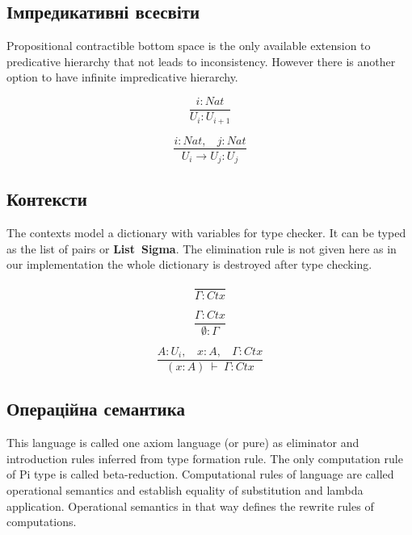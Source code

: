 \begin{definition}
\begin{definition}
\begin{definition}
\begin{definition}
\subsection*{Імпредикативні всесвіти}
Propositional contractible bottom space is the only
available extension to predicative hierarchy that not leads to inconsistency.
However there is another option to have infinite
impredicative hierarchy.

\begin{equation}
\tag{$A_2$}
\dfrac
{i: Nat}
{U_i : U_{i+1}}
\end{equation}

\begin{equation}
\tag{$R_2$}
\dfrac
{i : Nat,\ \ \ \ j : Nat}
{U_i \rightarrow U_{j} : U_{j}}
\end{equation}

\subsection{Контексти}

The contexts model a dictionary with variables for type checker.
It can be typed as the list of pairs or {\bf List\ Sigma}.
The elimination rule is not given here as in our implementation the whole dictionary is destroyed after type checking.

\begin{equation}
\tag{Ctx-formation}
\dfrac
{}
{\Gamma : Ctx}
\end{equation}

\begin{equation}
\tag{Ctx-intro$_1$}
\dfrac
{\Gamma : Ctx}
{\emptyset : \Gamma}
\end{equation}

\begin{equation}
\tag{Ctx-intro$_2$}
\dfrac
{A : U_i,\ \ \ \ x : A,\ \ \ \ \Gamma : Ctx}
{(x : A)\ \vdash\ \Gamma : Ctx}
\end{equation}

\newpage
\subsection{Операційна семантика}

This language is called one axiom language (or pure) as eliminator
and introduction rules inferred from type formation rule.
The only computation rule of Pi type is called beta-reduction.
Computational rules of language are called operational semantics
and establish equality of substitution and lambda application.
Operational semantics in that way defines the rewrite rules of computations.


\end{definition}
\end{definition}
\end{definition}
\end{definition}
